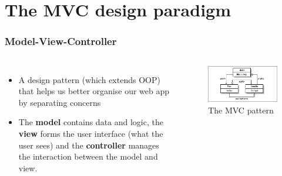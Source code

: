 \documentclass[10pt,t,xcolor=dvipsnames]{beamer}
\begin{document}
\section{The MVC design paradigm}
\begin{frame}[fragile]
\frametitle{Model-View-Controller}
\pause
\begin{columns}[l]
\begin{itemize}[<+->]
\item A design pattern (which extends OOP) that helps us better organise our web app by \alert{separating concerns}
\item The \textbf{model} contains \alert{data and logic}, the \textbf{view} forms the \alert{user interface} (what the user sees) and the \textbf{controller} manages the \alert{interaction} between the model and view.
\end{itemize}
\vspace{-0.5cm}
\begin{figure}
\hspace*{-0.5cm}
\centering
\includegraphics[scale=0.4]{../images/mvc-02.jpg}
\caption{The MVC pattern}
\end{figure}
\end{columns}
\end{frame}
\end{document}
